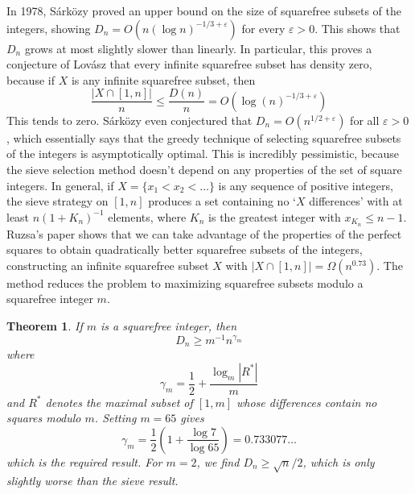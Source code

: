 \documentclass{article}
\theoremstyle{plain}
\theoremstyle{plain}
\newtheorem{theorem}{Theorem}
\begin{document}
In 1978, S\'{a}rk\"{o}zy proved an upper bound on the size of squarefree subsets of the integers, showing $D_n = O(n (\log n)^{-1/3 + \varepsilon})$ for every $\varepsilon > 0$. This shows that $D_n$ grows at most slightly slower than linearly. In particular, this proves a conjecture of Lov\'{a}sz that every infinite squarefree subset has density zero, because if $X$ is any infinite squarefree subset, then
%
\[ \frac{|X \cap [1,n]|}{n} \leq \frac{D(n)}{n} = O(\log(n)^{-1/3 + \varepsilon}) \]
%
This tends to zero. S\'{a}rk\"{o}zy even conjectured that $D_n = O(n^{1/2 + \varepsilon})$ for all $\varepsilon > 0$, which essentially says that the greedy technique of selecting squarefree subsets of the integers is asymptotically optimal. This is incredibly pessimistic, because the sieve selection method doesn't depend on any properties of the set of square integers. In general, if $X = \{ x_1 < x_2 < \dots \}$ is any sequence of positive integers, the sieve strategy on $[1,n]$ produces a set containing no `$X$ differences' with at least $n (1 + K_n)^{-1}$ elements, where $K_n$ is the greatest integer with $x_{K_n} \leq n - 1$. Ruzsa's paper shows that we can take advantage of the properties of the perfect squares to obtain quadratically better squarefree subsets of the integers, constructing an infinite squarefree subset $X$ with $|X \cap [1,n]| = \Omega(n^{0.73})$. The method reduces the problem to maximizing squarefree subsets modulo a squarefree integer $m$.

\begin{theorem}
    If $m$ is a squarefree integer, then
    \[ D_n \geq m^{-1} n^{\gamma_m} \]
    where
    \[ \gamma_m = \frac{1}{2} + \frac{\log_m |R^*|}{m} \]
    and $R^*$ denotes the maximal subset of $[1,m]$ whose differences contain no squares modulo $m$. Setting $m = 65$ gives
    \[ \gamma_m = \frac{1}{2} \left( 1 + \frac{\log 7}{\log 65} \right) = 0.733077 \dots \]
    which is the required result. For $m = 2$, we find $D_n \geq \sqrt{n}/2$, which is only slightly worse than the sieve result.
\end{theorem}
\end{document}
